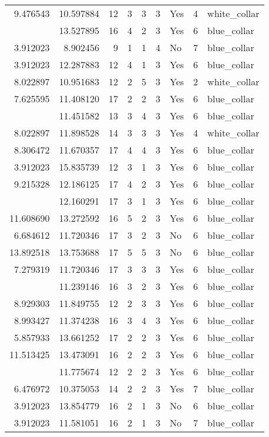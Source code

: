 \documentclass[
]{article}
\begin{document}
\begin{longtable}[t]{rrrrrllrl}
9.476543 & 10.597884 & 12 & 3 & 3 & 3 & Yes & 4 & white\_collar\\
\addlinespace
12.206323 & 13.527895 & 16 & 4 & 2 & 3 & Yes & 6 & blue\_collar\\
3.912023 & 8.902456 & 9 & 1 & 1 & 4 & No & 7 & blue\_collar\\
3.912023 & 12.287883 & 12 & 4 & 1 & 3 & Yes & 6 & blue\_collar\\
8.022897 & 10.951683 & 12 & 2 & 5 & 3 & Yes & 2 & white\_collar\\
7.625595 & 11.408120 & 17 & 2 & 2 & 3 & Yes & 6 & blue\_collar\\
\addlinespace
10.310618 & 11.451582 & 13 & 3 & 4 & 3 & Yes & 6 & blue\_collar\\
8.022897 & 11.898528 & 14 & 3 & 3 & 3 & Yes & 4 & white\_collar\\
8.306472 & 11.670357 & 17 & 4 & 4 & 3 & Yes & 6 & blue\_collar\\
3.912023 & 15.835739 & 12 & 3 & 1 & 3 & Yes & 6 & blue\_collar\\
9.215328 & 12.186125 & 17 & 4 & 2 & 3 & Yes & 6 & blue\_collar\\
\addlinespace
3.912023 & 12.160291 & 17 & 3 & 1 & 3 & Yes & 6 & blue\_collar\\
11.608690 & 13.272592 & 16 & 5 & 2 & 3 & Yes & 6 & blue\_collar\\
6.684612 & 11.720346 & 17 & 3 & 2 & 3 & No & 6 & blue\_collar\\
13.892518 & 13.753688 & 17 & 5 & 5 & 3 & No & 6 & blue\_collar\\
7.279319 & 11.720346 & 17 & 3 & 3 & 3 & Yes & 6 & blue\_collar\\
\addlinespace
7.919356 & 11.239146 & 16 & 3 & 2 & 3 & Yes & 6 & blue\_collar\\
8.929303 & 11.849755 & 12 & 2 & 3 & 3 & Yes & 6 & blue\_collar\\
8.993427 & 11.374238 & 16 & 3 & 4 & 3 & Yes & 6 & blue\_collar\\
5.857933 & 13.661252 & 17 & 2 & 2 & 3 & Yes & 6 & blue\_collar\\
11.513425 & 13.473091 & 16 & 2 & 2 & 3 & Yes & 6 & blue\_collar\\
\addlinespace
11.503380 & 11.775674 & 12 & 2 & 2 & 3 & Yes & 6 & blue\_collar\\
6.476972 & 10.375053 & 14 & 2 & 2 & 3 & Yes & 7 & blue\_collar\\
3.912023 & 13.854779 & 16 & 2 & 1 & 3 & No & 6 & blue\_collar\\
3.912023 & 11.581051 & 16 & 2 & 1 & 3 & No & 7 & blue\_collar\\

\end{longtable}
\end{document}
